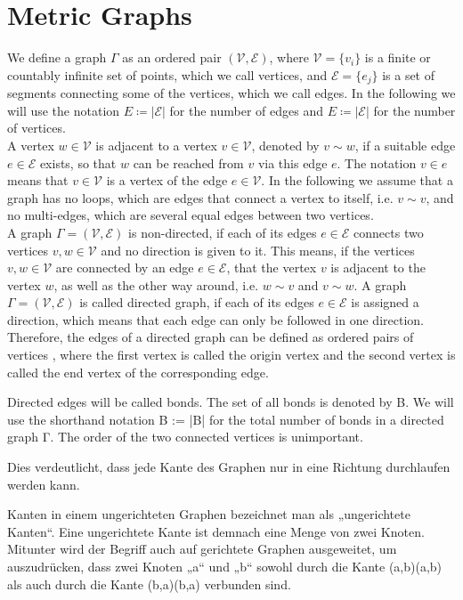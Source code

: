 \section{Metric Graphs}

We define a graph $\Gamma$ as an ordered pair $(\mathcal{V}, \mathcal{E})$, where $\mathcal{V} = \{v_i\}$ is a finite or countably infinite set of points, which we call vertices, and $\mathcal{E} = \{e_j\}$ is a set of segments connecting some of the vertices, which we call edges. In the following we will use the notation $E \coloneqq \left\lvert \mathcal{E} \right\rvert$ for the number of edges and $E \coloneqq \left\lvert \mathcal{E} \right\rvert$ for the number of vertices. \\
A vertex $w \in \mathcal{V}$ is adjacent to a vertex $v \in \mathcal{V}$, denoted by $v \sim w$, if a suitable edge $e \in \mathcal{E}$ exists, so that $w$ can be reached from $v$ via this edge $e$. The notation $v \in e$ means that $v \in \mathcal{V}$ is a vertex of the edge $e \in \mathcal{V}$. In the following we assume that a graph has no loops, which are edges that connect a vertex to itself, i.e. $v \sim v$, and no multi-edges, which are several equal edges between two vertices. \\
A graph $\Gamma = (\mathcal{V}, \mathcal{E})$ is non-directed, if each of its edges $e \in \mathcal{E}$ connects two vertices $v, w \in \mathcal{V}$ and no direction is given to it. This means, if the vertices $v, w \in \mathcal{V}$ are connected by an edge $e \in \mathcal{E}$, that the vertex $v$ is adjacent to the vertex $w$, as well as the other way around, i.e. $w \sim v$ and $v \sim w$. A graph $\Gamma = (\mathcal{V}, \mathcal{E})$ is called directed graph, if each of its edges $e \in \mathcal{E}$ is assigned a direction, which means that each edge can only be followed in one direction. Therefore, the edges of a directed graph can be defined as ordered pairs of vertices , where the first vertex is called the origin vertex and the second vertex is called the end vertex of the corresponding edge. 

Directed edges will be called bonds. The set of all bonds is denoted by B. We will use the shorthand notation B := |B| for the total number of bonds in a directed graph Γ.
The order of the two connected vertices is unimportant.


Dies verdeutlicht, dass jede Kante des Graphen nur in eine Richtung durchlaufen werden kann.

Kanten in einem ungerichteten Graphen bezeichnet man als „ungerichtete Kanten“. Eine ungerichtete Kante ist demnach eine Menge von zwei Knoten. Mitunter wird der Begriff auch auf gerichtete Graphen ausgeweitet, um auszudrücken, dass zwei Knoten „a“ und „b“ sowohl durch die Kante {\displaystyle \left(a,b\right)}\left(a,b\right) als auch durch die Kante {\displaystyle \left(b,a\right)}\left(b,a\right) verbunden sind.

